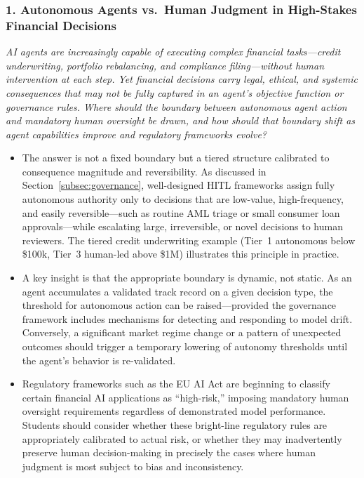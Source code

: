 \documentclass{article}
\begin{document}
\subsubsection*{1. Autonomous Agents vs.\ Human Judgment in High-Stakes Financial Decisions}
\textit{AI agents are increasingly capable of executing complex financial tasks---credit underwriting, portfolio rebalancing, and compliance filing---without human intervention at each step. Yet financial decisions carry legal, ethical, and systemic consequences that may not be fully captured in an agent's objective function or governance rules. Where should the boundary between autonomous agent action and mandatory human oversight be drawn, and how should that boundary shift as agent capabilities improve and regulatory frameworks evolve?}
\begin{itemize}
    \item The answer is not a fixed boundary but a tiered structure calibrated to consequence magnitude and reversibility. As discussed in Section~\ref{subsec:governance}, well-designed HITL frameworks assign fully autonomous authority only to decisions that are low-value, high-frequency, and easily reversible---such as routine AML triage or small consumer loan approvals---while escalating large, irreversible, or novel decisions to human reviewers. The tiered credit underwriting example (Tier~1 autonomous below \$100k, Tier~3 human-led above \$1M) illustrates this principle in practice.
    \item A key insight is that the appropriate boundary is dynamic, not static. As an agent accumulates a validated track record on a given decision type, the threshold for autonomous action can be raised---provided the governance framework includes mechanisms for detecting and responding to model drift. Conversely, a significant market regime change or a pattern of unexpected outcomes should trigger a temporary lowering of autonomy thresholds until the agent's behavior is re-validated.
    \item Regulatory frameworks such as the EU AI Act \cite{act2024eu} are beginning to classify certain financial AI applications as ``high-risk,'' imposing mandatory human oversight requirements regardless of demonstrated model performance. Students should consider whether these bright-line regulatory rules are appropriately calibrated to actual risk, or whether they may inadvertently preserve human decision-making in precisely the cases where human judgment is most subject to bias and inconsistency.
\end{itemize}
\end{document}
